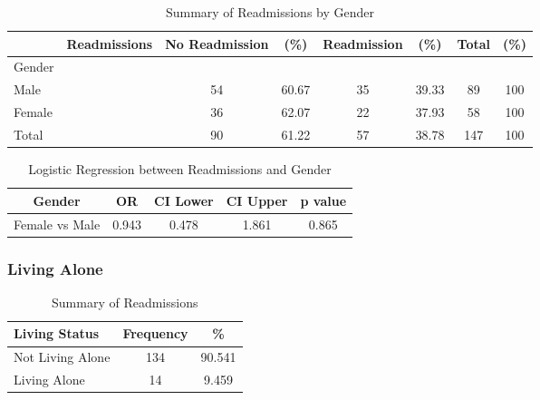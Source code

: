\documentclass[12pt,]{article}
\begin{document}
\begin{table}[!h]

\caption{\label{tab:unnamed-chunk-5}Summary of Readmissions by Gender}
\centering
\begin{tabular}{>{\centering\arraybackslash}p{5cm}ccccccc}
\toprule
  & Readmissions & No Readmission & (\%) & Readmission & (\%) & Total & (\%)\\
\midrule
Gender &  &  &  &  &  &  & \\
\rowcolor[HTML]{E3E5E7}  Male &  & 54 & 60.67 & 35 & 39.33 & 89 & 100\\
Female &  & 36 & 62.07 & 22 & 37.93 & 58 & 100\\
\rowcolor[HTML]{E3E5E7}  Total &  & 90 & 61.22 & 57 & 38.78 & 147 & 100\\
\bottomrule
\end{tabular}
\end{table}

\begin{table}[!h]

\caption{\label{tab:unnamed-chunk-5}Logistic Regression between Readmissions and Gender}
\centering
\begin{tabular}{ccccc}
\toprule
Gender & OR & CI Lower & CI Upper & p value\\
\midrule
\rowcolor{white}  Female vs Male & 0.943 & 0.478 & 1.861 & 0.865\\
\bottomrule
\end{tabular}
\end{table}

\pagebreak

\subsubsection{Living Alone}\label{living-alone}

\begin{table}[!h]

\caption{\label{tab:unnamed-chunk-6}Summary of Readmissions}
\centering
\begin{tabular}{>{\centering\arraybackslash}p{5cm}cc}
\toprule
Living Status & Frequency & \%\\
\midrule
Not Living Alone & 134 & 90.541\\
\rowcolor[HTML]{E3E5E7}  Living Alone & 14 & 9.459\\
\bottomrule
\end{tabular}
\end{table}
\end{document}

